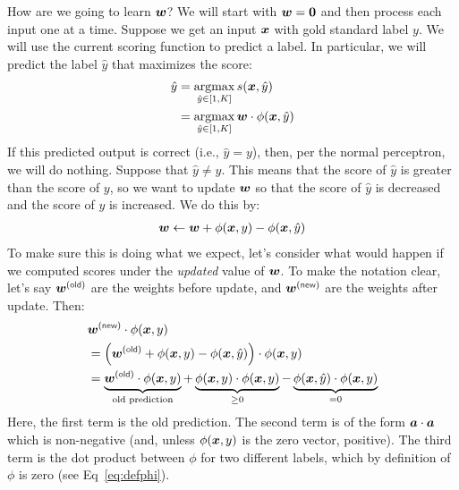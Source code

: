 How are we going to learn ${\boldsymbol{w}}$?
We will start with ${\boldsymbol{w}} = \boldsymbol{0}$ and then process each input one at a time.
Suppose we get an input ${\boldsymbol{x}}$ with gold standard label $y$.
We will use the current scoring function to predict a label.
In particular, we will predict the label $\hat y$ that maximizes the score:
%
\begin{align}
  \hat y &= \argmax_{\hat y \in [1,K]} s(\vx,\hat y)  \\
         &= \argmax_{\hat y \in [1,K]} \dotp{\vw}{\phi(\vx,\hat y)}
\end{align}
%
If this predicted output is correct (i.e., $\hat y=y$), then, per the normal perceptron, we will do nothing.
Suppose that $\hat y \neq y$.
This means that the score of $\hat y$ is greater than the score of $y$, so we want to update ${\boldsymbol{w}}$ so that the score of $\hat y$ is decreased and the score of $y$ is increased.
We do this by:
%
\begin{align}
  {\boldsymbol{w}} \leftarrow {\boldsymbol{w}} + \phi({\boldsymbol{x}},y) - \phi({\boldsymbol{x}},\hat y)
\end{align}
%
To make sure this is doing what we expect, let's consider what would happen if we computed scores under the \emph{updated} value of ${\boldsymbol{w}}$. To make the notation clear, let's say $\vw\xth{old}$ are the weights before update, and $\vw\xth{new}$ are the weights after update. Then:
%
\begin{align}
&  \dotp{\vw\xth{new}}{\phi(\vx,y)} \\
&= \dotp{\left( \vw\xth{old} + \phi(\vx,y) - \phi(\vx,\hat y) \right)}{\phi(\vx,y)} \\
&= \underbrace{\dotp{\vw\xth{old}}{\phi(\vx,y)}}_{\text{old prediction}}
 + \underbrace{\dotp{\phi(\vx,y)}{\phi(\vx,y)}}_{\geq 0}
 - \underbrace{\dotp{\phi(\vx,\hat y)}{\phi(\vx,y)}}_{= 0}
\end{align}
%
Here, the first term is the old prediction. The second term is of the form $\boldsymbol{a} \cdot \boldsymbol{a}$ which is non-negative (and, unless $\phi({\boldsymbol{x}},y)$ is the zero vector, positive). The third term is the dot product between $\phi$ for two different labels, which by definition of $\phi$ is zero (see Eq~\eqref{eq:defphi}).



